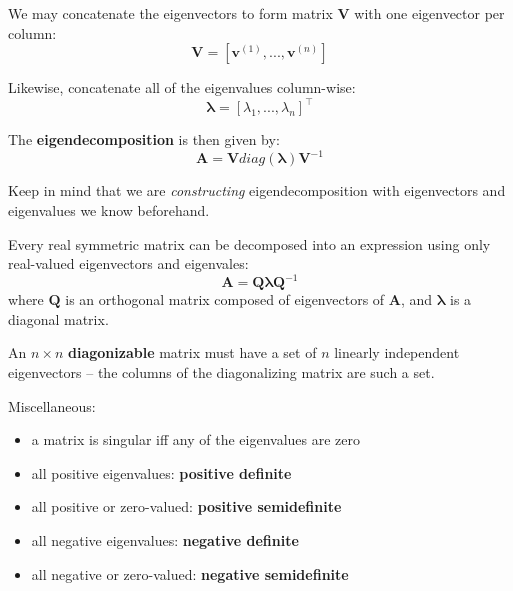 \documentclass[11pt,twocolumn]{report}
\begin{document}
We may concatenate the eigenvectors to form matrix $\bm{V}$ with one
eigenvector per column: 
\begin{equation*}
  \bm{V} = [\bm{v}^{(1)},...,\bm{v}^{(n)}]
\end{equation*}

Likewise, concatenate all of the eigenvalues column-wise:
\begin{equation*}
  \bm{\lambda} = [\lambda_1,...,\lambda_n]^\intercal
\end{equation*}

The \textbf{eigendecomposition} is then given by:
\begin{equation}
  \bm{A} = \bm{V}diag(\bm{\lambda})\bm{V}^{-1}
\end{equation}

Keep in mind that we are \textit{constructing} eigendecomposition with
eigenvectors and eigenvalues we know beforehand.

Every real symmetric matrix can be decomposed into an expression using only
real-valued eigenvectors and eigenvales:
\begin{equation}
  \bm{A} = \bm{Q}\bm{\lambda}\bm{Q}^{-1}
\end{equation}
where $\bm{Q}$ is an orthogonal matrix composed of eigenvectors of $\bm{A}$,
and $\bm{\lambda}$ is a diagonal matrix.

An $n \times n$ \textbf{diagonizable} matrix must have a set of $n$ linearly
independent eigenvectors -- the columns of the diagonalizing matrix are such a
set.

Miscellaneous:
\begin{itemize}
  \item a matrix is singular iff any of the eigenvalues are zero
  \item all positive eigenvalues: \textbf{positive definite}
  \item all positive or zero-valued: \textbf{positive semidefinite}
  \item all negative eigenvalues: \textbf{negative definite}
  \item all negative or zero-valued: \textbf{negative semidefinite}
\end{itemize}
\end{document}
